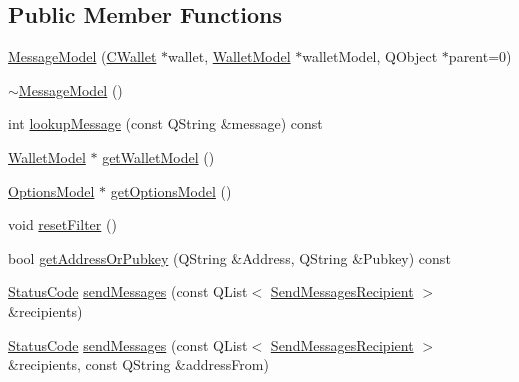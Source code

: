 \subsection*{Public Member Functions}
\begin{DoxyCompactItemize}
\item 
\hyperlink{class_message_model_abb708f049aab665144d273ae56baf2ec}{Message\+Model} (\hyperlink{class_c_wallet}{C\+Wallet} $\ast$wallet, \hyperlink{class_wallet_model}{Wallet\+Model} $\ast$wallet\+Model, Q\+Object $\ast$parent=0)
\item 
\hyperlink{class_message_model_a70a4aef17be44ef4a07ad17f5f630a30}{$\sim$\+Message\+Model} ()
\item 
int \hyperlink{class_message_model_aae76e8457be0de6ca10fe602d2be68f4}{lookup\+Message} (const Q\+String \&message) const 
\item 
\hyperlink{class_wallet_model}{Wallet\+Model} $\ast$ \hyperlink{class_message_model_ac397797af720d2da96739ba7deecd938}{get\+Wallet\+Model} ()
\item 
\hyperlink{class_options_model}{Options\+Model} $\ast$ \hyperlink{class_message_model_ae7eb986b2f9e4074871406e3fb0cfb91}{get\+Options\+Model} ()
\item 
void \hyperlink{class_message_model_a0a4f4df3a21e41803449692592f8d343}{reset\+Filter} ()
\item 
bool \hyperlink{class_message_model_a272e7ceeba4664046472e6f7c4d49d23}{get\+Address\+Or\+Pubkey} (Q\+String \&Address, Q\+String \&Pubkey) const 
\item 
\hyperlink{class_message_model_adac070d47edccd1bc8358cdc976f8509}{Status\+Code} \hyperlink{class_message_model_abeda81bd7dd800217f6f9c196559810b}{send\+Messages} (const Q\+List$<$ \hyperlink{class_send_messages_recipient}{Send\+Messages\+Recipient} $>$ \&recipients)
\item 
\hyperlink{class_message_model_adac070d47edccd1bc8358cdc976f8509}{Status\+Code} \hyperlink{class_message_model_a76c42a7c0940348d6c2bdd2111cc6424}{send\+Messages} (const Q\+List$<$ \hyperlink{class_send_messages_recipient}{Send\+Messages\+Recipient} $>$ \&recipients, const Q\+String \&address\+From)
\end{DoxyCompactItemize}
